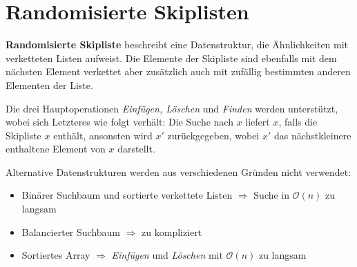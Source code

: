 \documentclass{scrartcl}%
\begin{document}

    \section*{Randomisierte Skiplisten}\label{sec:skiplisten}
    \textsf{\textbf{Randomisierte Skipliste}} beschreibt eine Datenstruktur, die Ähnlichkeiten mit verketteten Listen aufweist.
    Die Elemente der Skipliste sind ebenfalls mit dem nächsten Element verkettet aber zusätzlich auch mit zufällig bestimmten anderen Elementen der Liste.

    Die drei Hauptoperationen \textit{Einfügen, Löschen} und \textit{Finden} werden unterstützt, wobei sich Letzteres wie folgt verhält:
    Die Suche nach $x$ liefert $x$, falls die Skipliste $x$ enthält, ansonsten wird $x'$ zurückgegeben, wobei $x'$ das nächstkleinere enthaltene Element von $x$ darstellt.

    Alternative Datenstrukturen werden aus verschiedenen Gründen nicht verwendet:
    \begin{itemize}
        \item Binärer Suchbaum und sortierte verkettete Listen \newline $\Rightarrow$ Suche in $\mathcal{O}(n)$ zu langsam
        \item Balancierter Suchbaum \newline $\Rightarrow$ zu kompliziert
        \item Sortiertes Array \newline $\Rightarrow$ \textit{Einfügen} und \textit{Löschen} mit $\mathcal{O}(n)$ zu langsam
    \end{itemize}
\end{document}
